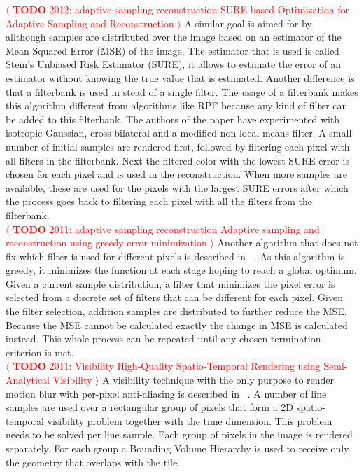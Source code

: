 \documentclass[review]{acmsiggraph}
\newcommand{\todo}[1]{\textcolor{red}{\(\langle\) \textbf{TODO} #1 \(\rangle\) }}
\begin{document}
\todo{2012: adaptive sampling reconstruction  SURE-based Optimization for Adaptive Sampling and Reconstruction}
A similar goal is aimed for by ~\cite{Li:2012:SBO} allthough samples are distributed over the image based on an estimator of the Mean Squared Error (MSE) of the image.
The estimator that is used is called Stein's Unbiased Risk Estimator (SURE), it allows to estimate the error of an estimator without knowing the true value that is estimated.
Another difference is that a filterbank is used in stead of a single filter.
The usage of a filterbank makes this algorithm different from algorithms like RPF because any kind of filter can be added to this filterbank.
The authors of the paper have experimented with isotropic Gaussian, cross bilateral and a modified non-local means filter.
A small number of initial samples are rendered first, followed by filtering each pixel with all filters in the filterbank.
Next the filtered color with the lowest SURE error is chosen for each pixel and is used in the reconstruction.
When more samples are available, these are used for the pixels with the largest SURE errors after which the process goes back to filtering each pixel with all the filters from the filterbank.
\\
\todo{2011: adaptive sampling reconstruction  Adaptive sampling and reconstruction using greedy error minimization}
Another algorithm that does not fix which filter is used for different pixels is described in ~\cite{Rousselle:2011:ASR:2070781.2024193}.
As this algorithm is greedy, it minimizes the function at each stage hoping to reach a global optimum.
Given a current sample distribution, a filter that minimizes the pixel error is selected from a discrete set of filters that can be different for each pixel.
Given the filter selection, addition samples are distributed to further reduce the MSE.
Because the MSE cannot be calculated exactly the change in MSE is calculated instead.
This whole process can be repeated until any chosen termination criterion is met.
\\
\todo{2011: Visibility  High-Quality Spatio-Temporal Rendering using Semi-Analytical Visibility}
A visibility technique with the only purpose to render motion blur with per-pixel anti-aliasing is described in ~\cite{Gribel2011}.
A number of line samples are used over a rectangular group of pixels that form a 2D spatio-temporal visibility problem together with the time dimension.
This problem needs to be solved per line sample.
Each group of pixels in the image is rendered separately.
For each group a Bounding Volume Hierarchy is used to receive only the geometry that overlaps with the tile. 
\end{document}
